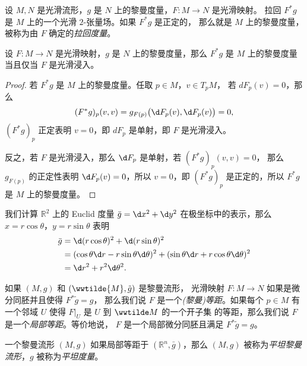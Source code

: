 设 $M,N$ 是光滑流形，$g$ 是 $N$ 上的黎曼度量，$F:M\to N$ 是光滑映射。
拉回 $F^*g$ 是 $M$ 上的一个光滑 $2$-张量场。如果 $F^*g$ 是正定的，
那么就是 $M$ 上的黎曼度量，被称为由 $F$ 确定的\emph{拉回度量}。

\begin{proposition}[拉回度量判别法]
  设 $F:M\to N$ 是光滑映射，$g$ 是 $N$ 上的黎曼度量，那么 
  $F^*g$ 是 $M$ 上的黎曼度量当且仅当 $F$ 是光滑浸入。
\end{proposition}
\begin{proof}
  若 $F^*g$ 是 $M$ 上的黎曼度量。任取 $p\in M$，$v\in T_pM$，
  若 $dF_p(v)=0$，那么
  \[
    (F^*g)_p(v,v)=g_{F(p)}\bigl(\d F_p(v),\d F_p(v)\bigr)  =0,
  \]
  $(F^*g)_p$ 正定表明 $v=0$，即 $dF_p$ 是单射，即 $F$ 是光滑浸入。

  反之，若 $F$ 是光滑浸入，那么 $\d F_p$ 是单射，若 $(F^*g)_p(v,v)=0$，
  那么 $g_{F(p)}$ 的正定性表明 $\d F_p(v)=0$，所以 $v=0$，即
  $(F^*g)_p$ 是正定的，所以 $F^*g$ 是 $M$ 上的黎曼度量。
\end{proof}

\begin{example}\label{exa:polar coordinate of euclid metric}
  我们计算 $\mathbb{R}^2$ 上的 Euclid 度量 $\bar g=\d x^2+\d y^2$
  在极坐标中的表示，那么 $x=r\cos\theta$，$y=r\sin\theta$ 表明
  \begin{align*}
    \bar g&=\d (r\cos\theta)^2+\d (r\sin\theta)^2\\
    &=(\cos\theta\d r-r\sin\theta\d\theta)^2+(\sin\theta\d r+r\cos\theta\d\theta)^2\\
    &=\d r^2+r^2\d\theta^2.
  \end{align*}
\end{example}

如果 $(M,g)$ 和 $(\wwtilde{M},\tilde g)$ 是黎曼流形，
光滑映射 $F:M\to N$ 如果是微分同胚并且使得 $F^*\tilde g=g$，
那么我们说 $F$ 是一个\emph{(黎曼)等距}。如果每个 $p\in M$
有一个邻域 $U$ 使得 $F|_U$ 是 $U$ 到 $\wwtilde M$ 的一个开子集
的等距，那么我们说 $F$ 是一个\emph{局部等距}。等价地说，
$F$ 是一个局部微分同胚且满足 $F^*\tilde{g}=g$。

一个黎曼流形 $(M,g)$ 如果局部等距于 $(\mathbb{R}^n,\bar g)$，那么
$(M,g)$ 被称为\emph{平坦黎曼流形}，$g$ 被称为\emph{平坦度量}。

